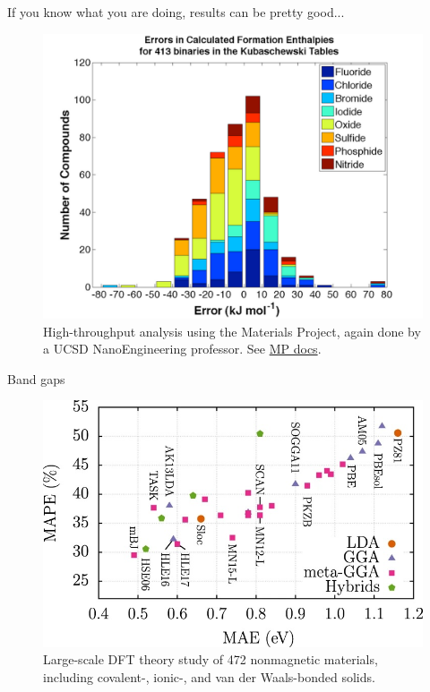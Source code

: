 \documentclass[aspectratio=169]{beamer}
\begin{document}
    \begin{frame}{If you know what you are doing, results can be pretty good...}
        \begin{figure}
            \centering
            \includegraphics[width=0.5\linewidth]{lectures/figures/6_formation_energies_stats.png}
            \caption{High-throughput analysis using the Materials Project, again done by a UCSD NanoEngineering professor. See \href{https://docs.materialsproject.org/methodology/materials-methodology/thermodynamic-stability/thermodynamic-stability/anion-and-gga-gga+u-mixing}{MP docs}.}
        \end{figure}
    \end{frame}

    \begin{frame}{Band gaps}
        \begin{figure}
            \centering
            \includegraphics[width=0.55\linewidth]{lectures/figures/6_bandgaps.jpeg}
            \caption{Large-scale DFT theory study of 472 nonmagnetic materials, including covalent-, ionic-, and van der Waals-bonded solids.\cite{borlidoExchangecorrelationFunctionalsBand2020}}
        \end{figure}
    \end{frame}
\end{document}
